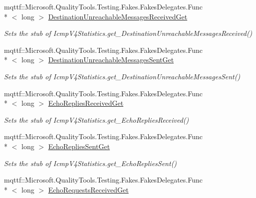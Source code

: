 \begin{DoxyCompactItemize}
mqttf\-::\-Microsoft.\-Quality\-Tools.\-Testing.\-Fakes.\-Fakes\-Delegates.\-Func\\*
$<$ long $>$ \hyperlink{class_system_1_1_net_1_1_network_information_1_1_fakes_1_1_stub_icmp_v4_statistics_aa0dabfd14c731c13e591160bafc365e4}{Destination\-Unreachable\-Messages\-Received\-Get}
\begin{DoxyCompactList}\small\item\em Sets the stub of Icmp\-V4\-Statistics.\-get\-\_\-\-Destination\-Unreachable\-Messages\-Received()\end{DoxyCompactList}\item 
mqttf\-::\-Microsoft.\-Quality\-Tools.\-Testing.\-Fakes.\-Fakes\-Delegates.\-Func\\*
$<$ long $>$ \hyperlink{class_system_1_1_net_1_1_network_information_1_1_fakes_1_1_stub_icmp_v4_statistics_ac0fe7677e419600e6be110d8a3f87850}{Destination\-Unreachable\-Messages\-Sent\-Get}
\begin{DoxyCompactList}\small\item\em Sets the stub of Icmp\-V4\-Statistics.\-get\-\_\-\-Destination\-Unreachable\-Messages\-Sent()\end{DoxyCompactList}\item 
mqttf\-::\-Microsoft.\-Quality\-Tools.\-Testing.\-Fakes.\-Fakes\-Delegates.\-Func\\*
$<$ long $>$ \hyperlink{class_system_1_1_net_1_1_network_information_1_1_fakes_1_1_stub_icmp_v4_statistics_a71b4b70b9d8d49be1e0bb3fa305d84bd}{Echo\-Replies\-Received\-Get}
\begin{DoxyCompactList}\small\item\em Sets the stub of Icmp\-V4\-Statistics.\-get\-\_\-\-Echo\-Replies\-Received()\end{DoxyCompactList}\item 
mqttf\-::\-Microsoft.\-Quality\-Tools.\-Testing.\-Fakes.\-Fakes\-Delegates.\-Func\\*
$<$ long $>$ \hyperlink{class_system_1_1_net_1_1_network_information_1_1_fakes_1_1_stub_icmp_v4_statistics_acf399e3f97f88ed5b56f0ee4f8e3b179}{Echo\-Replies\-Sent\-Get}
\begin{DoxyCompactList}\small\item\em Sets the stub of Icmp\-V4\-Statistics.\-get\-\_\-\-Echo\-Replies\-Sent()\end{DoxyCompactList}\item 
mqttf\-::\-Microsoft.\-Quality\-Tools.\-Testing.\-Fakes.\-Fakes\-Delegates.\-Func\\*
$<$ long $>$ \hyperlink{class_system_1_1_net_1_1_network_information_1_1_fakes_1_1_stub_icmp_v4_statistics_accb5a67fcab24ce6d617acf3aaf2f31d}{Echo\-Requests\-Received\-Get}

\end{DoxyCompactItemize}
